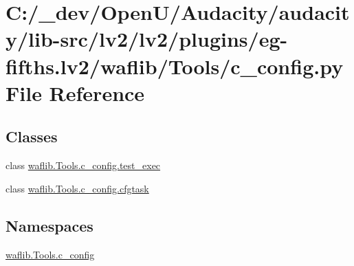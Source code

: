 \hypertarget{lv2_2plugins_2eg-fifths_8lv2_2waflib_2_tools_2c__config_8py}{}\section{C\+:/\+\_\+dev/\+Open\+U/\+Audacity/audacity/lib-\/src/lv2/lv2/plugins/eg-\/fifths.lv2/waflib/\+Tools/c\+\_\+config.py File Reference}
\label{lv2_2plugins_2eg-fifths_8lv2_2waflib_2_tools_2c__config_8py}
\subsection*{Classes}
\begin{DoxyCompactItemize}
\item 
class \hyperlink{classwaflib_1_1_tools_1_1c__config_1_1test__exec}{waflib.\+Tools.\+c\+\_\+config.\+test\+\_\+exec}
\item 
class \hyperlink{classwaflib_1_1_tools_1_1c__config_1_1cfgtask}{waflib.\+Tools.\+c\+\_\+config.\+cfgtask}
\end{DoxyCompactItemize}
\subsection*{Namespaces}
\begin{DoxyCompactItemize}
\item 
 \hyperlink{namespacewaflib_1_1_tools_1_1c__config}{waflib.\+Tools.\+c\+\_\+config}
\end{DoxyCompactItemize}
